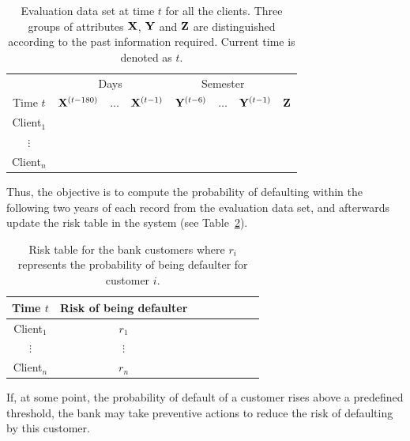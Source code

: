 \begin{itemize}
\begin{table}[ht!]
\centering
\begin{tabular}{c|ccc|ccc|c}
	&\multicolumn{3}{c|}{Days} & \multicolumn{3}{c|}{Semester} \\
     Time $t$              & $\mathbf{X}^{(t-180)}$ & $\ldots$ & $\mathbf{X}^{(t-1)} $ & $\mathbf{Y}^{(t-6)}$  & $\ldots$ & $\mathbf{Y}^{(t-1)} $ & $\mathbf{Z}$  \\  
\hline
Client$_1$  &                                                  &              &                     &                               &                     &        \\ 
$\vdots$      &                                                 &               &                     &                                &                     &      \\ 
Client$_n$  &                                                &               &                     &                                &                     &     \\ 
\end{tabular}
\caption{Evaluation data set at time $t$ for all the clients. Three groups of attributes $\mathbf{X}$, $\mathbf{Y}$ and $\mathbf{Z}$ are distinguished according to the past information required. Current time is denoted as $t$.}
\label{tab:EvaluationDataset} 
\end{table}

Thus, the objective is to compute the probability of defaulting within the following two years of each record from the evaluation data set, and afterwards update the risk table in the system (see Table~\ref{tab:riskTable}).

\begin{table}[ht!]
\centering
\begin{tabular}{c|ccc|ccc|c}
     Time $t$  & Risk of being defaulter \\  
\hline
Client$_1$  &    $r_1$  \\ 
$\vdots$      &   $\vdots$   \\ 
Client$_n$  &   $r_n$  \\ 
\end{tabular} 
\caption{Risk table for the bank customers where $r_i$ represents the probability of being defaulter for customer $i$.}
\label{tab:riskTable}
\end{table}

If, at some point, the probability of default of a customer rises above a predefined threshold, the bank may take preventive actions to reduce the risk of defaulting by this customer.



\end{itemize}
